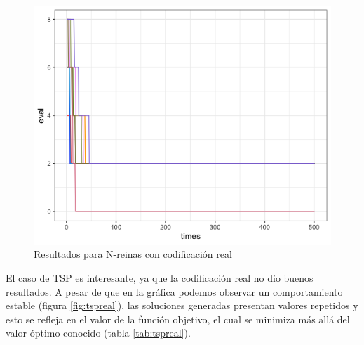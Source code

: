 \documentclass[letterpaper,12pt]{article}
\theoremstyle{definition}
\begin{document}
\begin{figure}[H]
  
  \includegraphics[width=\linewidth]{real_nq}
  \caption{Resultados para N-reinas con codificación real}
  \label{fig:nqreal}
\end{figure}

El caso de TSP es interesante, ya que la codificación real no dio buenos resultados. A pesar de que en la gráfica podemos observar un comportamiento estable (figura \ref{fig:tspreal}), las soluciones generadas presentan valores repetidos y esto se refleja en el valor de la función objetivo, el cual se minimiza más allá del valor óptimo conocido (tabla \ref{tab:tspreal}).
\end{document}
